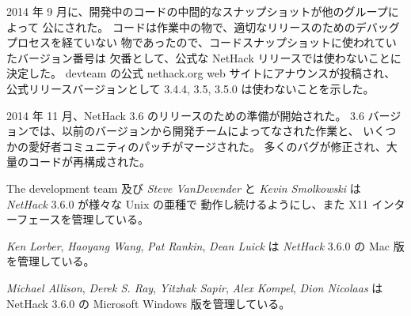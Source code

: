 \medskip
2014 年 9 月に、開発中のコードの中間的なスナップショットが他のグループによって
公にされた。
コードは作業中の物で、適切なリリースのためのデバッグプロセスを経ていない
物であったので、コードスナップショットに使われていたバージョン番号は
欠番として、公式な NetHack リリースでは使わないことに決定した。
devteam の公式 nethack.org web サイトにアナウンスが投稿され、
公式リリースバージョンとして 3.4.4, 3.5, 3.5.0 は使わないことを示した。

\medskip
2014 年 11 月、NetHack 3.6 のリリースのための準備が開始された。
3.6 バージョンでは、以前のバージョンから開発チームによってなされた作業と、
いくつかの愛好者コミュニティのパッチがマージされた。
多くのバグが修正され、大量のコードが再構成された。


\medskip
The development team 及び {\it Steve VanDevender} と
{\it Kevin Smolkowski} は {\it NetHack\/} 3.6.0 が様々な Unix の亜種で
動作し続けるようにし、また X11 インターフェースを管理している。

{\it Ken Lorber}, {\it Haoyang Wang}, {\it Pat Rankin}, {\it Dean Luick} は
{\it NetHack\/} 3.6.0 の Mac 版を管理している。

\medskip
{\it Michael Allison}, {\it Derek S. Ray}, {\it Yitzhak Sapir}, 
{\it Alex Kompel}, {\it Dion Nicolaas} は NetHack 3.6.0 の
Microsoft Windows 版を管理している。

